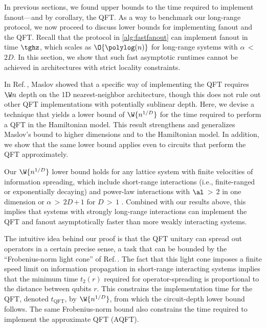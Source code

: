 In previous sections, we found upper bounds to the time required to implement fanout---and by corollary, the QFT.
As a way to benchmark our long-range protocol, we now proceed to discuss lower bounds for implementing fanout and the QFT.
Recall that the protocol in \cref{alg:fastfanout} can implement fanout in time $\tghz$, which scales as $\O{\polylog(n)}$ for long-range systems with $\alpha$\,$<$\,$2D$.
In this section, we show that such fast asymptotic runtimes cannot be achieved in architectures with strict locality constraints.

In Ref.\,\cite{Maslov2007}, Maslov showed that a specific way of implementing the QFT requires $\W n$ depth on the 1D  nearest-neighbor architecture, though this does not rule out other QFT implementations with potentially sublinear depth.
Here, we devise a technique that yields a lower bound of $\W {n^{1/D}}$ for the time required to perform a QFT in the Hamiltonian model.
This result strengthens and generalizes Maslov's bound to higher dimensions and to the Hamiltonian model.
In addition, we show that the same lower bound applies even to circuits that perform the QFT approximately.

Our $\W {n^{1/D}}$ lower bound holds for any lattice system with finite velocities of information spreading, which include short-range interactions (i.e., finite-ranged or exponentially decaying) and power-law interactions with $\al$\,$>$\,$2$ in one dimension or $\alpha$\,$>$\,$2D$\,$+$\,$1$ for $D$\,$>$\,$1$ \cite{Lieb1972,Chen2019,kuwaharaStrictlyLinearLight2020}.
Combined with our results above, this implies that systems with strongly long-range interactions can implement the QFT and fanout asymptotically faster than more weakly interacting systems.

The intuitive idea behind our proof is that the QFT unitary can spread out operators in a certain precise sense, a task that can be bounded by the ``Frobenius-norm light cone'' of Ref.\,\cite{Tran2020}.
The fact that this light cone imposes a finite speed limit on information propagation in short-range interacting systems implies that the minimum time $t_2(r)$ required for operator-spreading is proportional to the distance between qubits $r$.
This constrains the implementation time for the QFT, denoted $t_\mathrm{QFT}$, by $\W {n^{1/D}}$, from which the circuit-depth lower bound follows.
The same Frobenius-norm bound also constrains the time required to implement the approximate QFT (AQFT).


